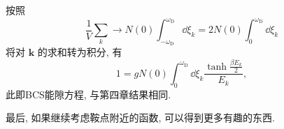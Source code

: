 按照
\begin{equation}
\frac{1}{V}\sum_k \to N(0)\int_{-\omega_{\mathrm{D}}}^{\omega_{\mathrm{D}}}\dd \xi_k=2N(0)\int_{0}^{\omega_{\mathrm{D}}}\dd \xi_k
\end{equation}
将对 $\boldsymbol k$ 的求和转为积分, 有
\begin{equation}
1=gN(0)\int_0^{\omega_{\mathrm{D}}} \dd \xi_k \frac{\tanh \frac{\beta E_{k}}{2}}{ E_{k}},
\end{equation}
此即BCS能隙方程, 与第四章结果相同. 

最后, 如果继续考虑鞍点附近的函数, 可以得到更多有趣的东西.










